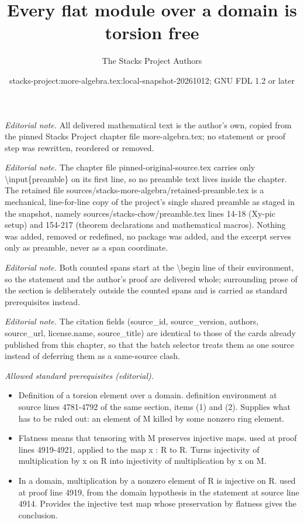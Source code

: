 \documentclass[10pt,a4paper]{amsart}
\title{Every flat module over a domain is torsion free}
\author{The Stacks Project Authors}
\date{stacks-project:more-algebra.tex:local-snapshot-20261012; GNU FDL 1.2 or later}
\theoremstyle{plain}
\theoremstyle{definition}
\theoremstyle{remark}
\numberwithin{equation}{subsection}
\begin{document}
\maketitle
\setcounter{subsection}{1}
\noindent\textit{Editorial note.} All delivered mathematical text is the author's own, copied from the pinned Stacks Project chapter file more-algebra.tex; no statement or proof step was rewritten, reordered or removed.\par\medskip
\noindent\textit{Editorial note.} The chapter file pinned-original-source.tex carries only \textbackslash{}input\{preamble\} on its first line, so no preamble text lives inside the chapter. The retained file sources/stacks-more-algebra/retained-preamble.tex is a mechanical, line-for-line copy of the project's single shared preamble as staged in the snapshot, namely sources/stacks-chow/preamble.tex lines 14-18 (Xy-pic setup) and 154-217 (theorem declarations and mathematical macros). Nothing was added, removed or redefined, no package was added, and the excerpt serves only as preamble, never as a span coordinate.\par\medskip
\noindent\textit{Editorial note.} Both counted spans start at the \textbackslash{}begin line of their environment, so the statement and the author's proof are delivered whole; surrounding prose of the section is deliberately outside the counted spans and is carried as standard prerequisites instead.\par\medskip
\noindent\textit{Editorial note.} The citation fields (source\_id, source\_version, authors, source\_url, license.name, source\_title) are identical to those of the cards already published from this chapter, so that the batch selector treats them as one source instead of deferring them as a same-source clash.\par\medskip
\noindent\textit{Allowed standard prerequisites (editorial).}\begin{itemize}
\item Definition of a torsion element over a domain. definition environment at source lines 4781-4792 of the same section, items (1) and (2). Supplies what has to be ruled out: an element of M killed by some nonzero ring element.
\item Flatness means that tensoring with M preserves injective maps. used at proof lines 4919-4921, applied to the map x : R to R. Turns injectivity of multiplication by x on R into injectivity of multiplication by x on M.
\item In a domain, multiplication by a nonzero element of R is injective on R. used at proof line 4919, from the domain hypothesis in the statement at source line 4914. Provides the injective test map whose preservation by flatness gives the conclusion.
\end{itemize}\medskip
\end{document}
